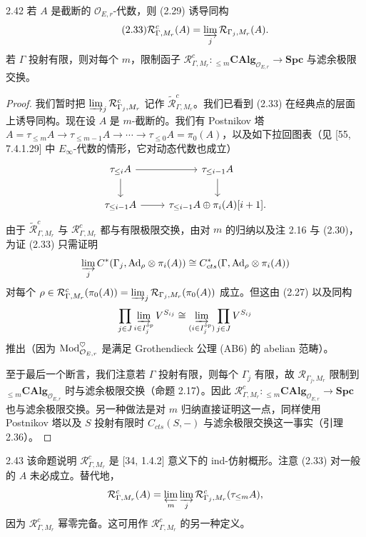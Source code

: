 \begin{prop}{2.42}
若 $A$ 是截断的 $\mathcal O_{E,r}$-代数，则 (2.29) 诱导同构
\begin{equation}
\tag{2.33}
\mathcal R^c_{\Gamma,M_r}(A) = \varinjlim_j \mathcal R_{\Gamma_j,M_r}(A).
\end{equation}
若 $\Gamma$ 投射有限，则对每个 $m$，限制函子 $\mathcal R^c_{\Gamma,M_r}\colon {}_{\le m}\mathbf{CAlg}_{\mathcal O_{E,r}} \to \mathbf{Spc}$ 与滤余极限交换。
\label{prop:zhu2-2-42}
\end{prop}

\begin{proof}
我们暂时把 $\varinjlim_j \mathcal R^c_{\Gamma_j,M_r}$ 记作 $\widetilde{\mathcal R}^c_{\Gamma,M_r}$。我们已看到 (2.33) 在经典点的层面上诱导同构。现在设 $A$ 是 $m$-截断的。我们有 Postnikov 塔 $A = \tau_{\le m}A \to \tau_{\le m-1}A \to \cdots \to \tau_{\le 0}A = \pi_0(A)$，以及如下拉回图表（见 [55, 7.4.1.29] 中 $E_\infty$-代数的情形，它对动态代数也成立）
\[
\begin{tikzcd}
\tau_{\le i}A \arrow[r] \arrow[d] & \tau_{\le i-1}A \arrow[d] \\
\tau_{\le i-1}A \arrow[r] & \tau_{\le i-1}A\oplus\pi_i(A)[i+1].
\end{tikzcd}
\]
由于 $\widetilde{\mathcal R}^c_{\Gamma,M_r}$ 与 $\mathcal R^c_{\Gamma,M_r}$ 都与有限极限交换，由对 $m$ 的归纳以及注 2.16 与 (2.30)，为证 (2.33) 只需证明
\[
\varinjlim_j C^*(\Gamma_j, \mathrm{Ad}_\rho\otimes\pi_i(A)) \cong C^*_{cts}(\Gamma, \mathrm{Ad}_\rho\otimes\pi_i(A))
\]
对每个 $\rho \in \mathcal R^c_{\Gamma,M_r}(\pi_0(A)) = \varinjlim_j \mathcal R_{\Gamma_j,M_r}(\pi_0(A))$ 成立。但这由 (2.27) 以及同构
\[
\prod_{j\in J}\varinjlim_{i\in I_j^{op}}V^{S_{ij}} \cong \varinjlim_{(i\in I_j^{op})}\prod_{j\in J}V^{S_{ij}}
\]
推出（因为 $\operatorname{Mod}^\heartsuit_{\mathcal O_{E,r}}$ 是满足 Grothendieck 公理 (AB6) 的 abelian 范畴）。

至于最后一个断言，我们注意若 $\Gamma$ 投射有限，则每个 $\Gamma_j$ 有限，故 $\mathcal R_{\Gamma_j,M_r}$ 限制到 ${}_{\le m}\mathbf{CAlg}_{\mathcal O_{E,r}}$ 时与滤余极限交换（命题 2.17）。因此 $\mathcal R^c_{\Gamma,M_r}\colon {}_{\le m}\mathbf{CAlg}_{\mathcal O_{E,r}} \to \mathbf{Spc}$ 也与滤余极限交换。另一种做法是对 $m$ 归纳直接证明这一点，同样使用 Postnikov 塔以及 $S$ 投射有限时 $C_{cts}(S,-)$ 与滤余极限交换这一事实（引理 2.36）。
\end{proof}

\begin{rem}{2.43}
该命题说明 $\mathcal R^c_{\Gamma,M_r}$ 是 [34, 1.4.2] 意义下的 ind-仿射概形。注意 (2.33) 对一般的 $A$ 未必成立。替代地，
\[
\mathcal R^c_{\Gamma,M_r}(A) = \varprojlim_m\varinjlim_j \mathcal R^c_{\Gamma_j,M_r}(\tau_{\le m}A),
\]
因为 $\mathcal R^c_{\Gamma,M_r}$ 幂零完备。这可用作 $\mathcal R^c_{\Gamma,M_r}$ 的另一种定义。
\label{rem:zhu2-2-43}
\end{rem}

